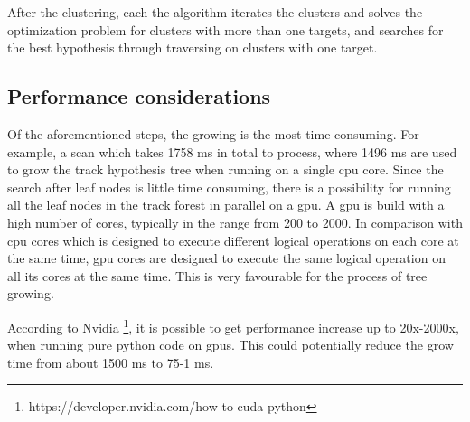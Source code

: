 After the clustering, each the algorithm iterates the clusters and solves the optimization problem for clusters with more than one targets, and searches for the best hypothesis through traversing on clusters with one target.

\subsection{Performance considerations}
Of the aforementioned steps, the growing is the most time consuming. For example, a scan which takes 1758 ms in total to process, where 1496 ms are used to grow the \gls{track hypothesis tree} when running on a single \gls{cpu} core. Since the search after leaf nodes is little time consuming, there is a possibility for running all the leaf nodes in the track forest in parallel on a \gls{gpu}. A \gls{gpu} is build with a high number of cores, typically in the range from 200 to 2000. In comparison with \gls{cpu} cores which is designed to execute different logical operations on each core at the same time, \gls{gpu} cores are designed to execute the same logical operation on all its cores at the same time. This is very favourable for the process of tree growing.

According to Nvidia \footnote{https://developer.nvidia.com/how-to-cuda-python}, it is possible to get performance increase up to 20x-2000x, when running pure \Gls{python} code on \Glspl{gpu}. This could potentially reduce the grow time from about 1500 ms to 75-1 ms.